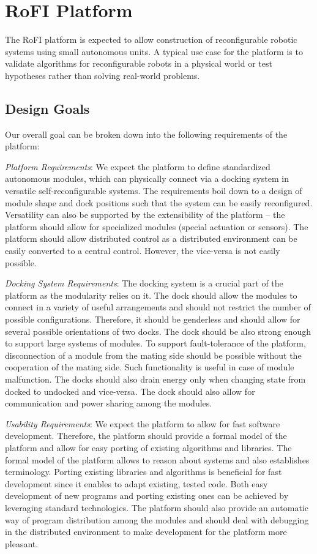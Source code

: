 \chapter{RoFI Platform}\label{chap:rofi}

The RoFI platform is expected to allow construction of reconfigurable robotic
systems using small autonomous units. A typical use case for the platform is to
validate algorithms for reconfigurable robots in a physical world or test
hypotheses rather than solving real-world problems.

\section{Design Goals}\label{sec:design_goals}

Our overall goal can be broken down into the following requirements of the
platform:

\emph{Platform Requirements}: We expect the platform to define standardized
autonomous modules, which can physically connect via a docking system in
versatile self-reconfigurable systems. The requirements boil down to a design of
module shape and dock positions such that the system can be easily reconfigured.
Versatility can also be supported by the extensibility of the platform -- the
platform should allow for specialized modules (special actuation or sensors).
The platform should allow distributed control as a distributed environment can
be easily converted to a central control. However, the vice-versa is not easily
possible.

\emph{Docking System Requirements}: The docking system is a crucial part of the
platform as the modularity relies on it. The dock should allow the modules to
connect in a variety of useful arrangements and should not restrict the number
of possible configurations. Therefore, it should be genderless and should allow
for several possible orientations of two docks. The dock should be also strong
enough to support large systems of modules. To support fault-tolerance of the
platform, disconnection of a module from the mating side should be possible
without the cooperation of the mating side. Such functionality is useful in case
of module malfunction. The docks should also drain energy only when changing
state from docked to undocked and vice-versa. The dock should also allow for
communication and power sharing among the modules.

\emph{Usability Requirements}: We expect the platform to allow for fast software
development. Therefore, the platform should provide a formal model of the
platform and allow for easy porting of existing algorithms and libraries. The
formal model of the platform allows to reason about systems and also establishes
terminology. Porting existing libraries and algorithms is beneficial for fast
development since it enables to adapt existing, tested code. Both easy
development of new programs and porting existing ones can be achieved by
leveraging standard technologies. The platform should also provide an automatic
way of program distribution among the modules and should deal with debugging in
the distributed environment to make development for the platform more pleasant.


